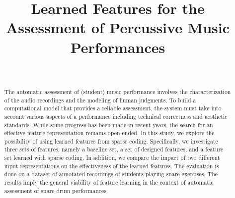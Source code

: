 \documentclass[conference]{IEEEtran}
\begin{document}
%
\title{Learned Features for the Assessment of Percussive Music Performances}

\author{
\and
{}
\\}





\maketitle


\begin{abstract}
The automatic assessment of (student) music performance involves the characterization of the audio recordings and the modeling of human judgments. To build a computational model that provides a reliable assessment, the system must take into account various aspects of a performance including technical correctness and aesthetic standards. While some progress has been made in recent years, the search for an effective feature representation remains open-ended. In this study, we explore the possibility of using learned features from sparse coding. Specifically, we investigate three sets of features, namely a baseline set, a set of designed features, and a feature set learned with sparse coding. In addition, we compare the impact of two different input representations on the effectiveness of the learned features. The evaluation is done on a dataset of annotated recordings of students playing snare exercises. The results imply the general viability of feature learning in the context of automatic assessment of snare drum performances.   
\end{abstract}
\end{document}
